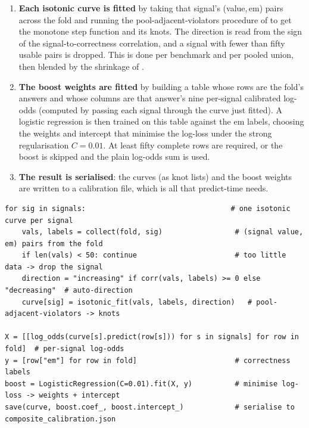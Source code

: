 \begin{enumerate}[leftmargin=1.6em, itemsep=2pt]
  \item \textbf{Each isotonic curve is fitted} by taking that signal's
  (value,\,$\mathrm{em}$) pairs across the fold and running the
  pool-adjacent-violators procedure of  to get the
  monotone step function and its knots. The direction is read from the sign of the
  signal-to-correctness correlation, and a signal with fewer than fifty usable pairs
  is dropped. This is done per benchmark and per pooled union, then blended by the
  shrinkage of .
  \item \textbf{The boost weights are fitted} by building a table whose rows are the
  fold's answers and whose columns are that answer's nine per-signal calibrated
  log-odds (computed by passing each signal through the curve just fitted). A logistic
  regression is then trained on this table against the $\mathrm{em}$ labels, choosing
  the weights and intercept that minimise the log-loss under the strong regularisation
  $C = 0.01$. At least fifty complete rows are required, or the boost is skipped and
  the plain log-odds sum is used.
  \item \textbf{The result is serialised}: the curves (as knot lists) and the boost
  weights are written to a calibration file, which is all that predict-time needs.
\end{enumerate}

\begin{lstlisting}[caption={Fitting the composite, condensed from \texttt{caem/verification/cal\_prob\_composite.py}.}, label={lst:fit}]
for sig in signals:                                  # one isotonic curve per signal
    vals, labels = collect(fold, sig)                 # (signal value, em) pairs from the fold
    if len(vals) < 50: continue                       # too little data -> drop the signal
    direction = "increasing" if corr(vals, labels) >= 0 else "decreasing"  # auto-direction
    curve[sig] = isotonic_fit(vals, labels, direction)   # pool-adjacent-violators -> knots

X = [[log_odds(curve[s].predict(row[s])) for s in signals] for row in fold]  # per-signal log-odds
y = [row["em"] for row in fold]                       # correctness labels
boost = LogisticRegression(C=0.01).fit(X, y)          # minimise log-loss -> weights + intercept
save(curve, boost.coef_, boost.intercept_)            # serialise to composite_calibration.json
\end{lstlisting}

